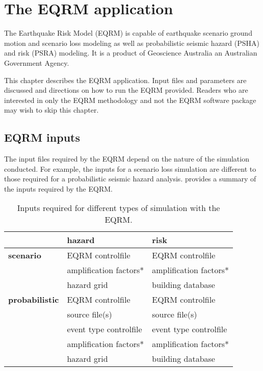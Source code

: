 \chapter{The EQRM application}
\label{ch:application}

The Earthquake Risk Model (EQRM) is capable of earthquake scenario
ground motion and scenario loss modeling as well as probabilistic
seismic hazard (PSHA) and risk (PSRA) modeling. It is a product of
Geoscience Australia an Australian Government Agency.

This chapter describes the EQRM application. Input files and
parameters are discussed and directions on how to run the EQRM
provided. Readers who are interested in only the EQRM methodology
and not the EQRM software package may wish to skip this chapter.

\section{EQRM inputs}

The input files required by the EQRM depend on the nature of the
simulation conducted. For example, the inputs for a scenario loss
simulation are different to those required for a probabilistic
seismic hazard analysis.  provides a
summary of the inputs required by the EQRM.


\begin{table}
\begin{centering}
\caption{Inputs required for different types of simulation with the
EQRM.} \label{tab:input-overview}
\begin{tabular}{|l|l|l|}
\hline
 & \textbf{hazard} & \textbf{risk} \\
\hline
\textbf{scenario} & EQRM controlfile & EQRM controlfile \\
  & amplification factors* & amplification factors* \\
  & hazard grid & building database \\
\hline
\textbf{probabilistic} & EQRM controlfile & EQRM controlfile\\
  & source file(s) & source file(s) \\
  & event type controlfile & event type controlfile \\
  & amplification factors* & amplification factors* \\
  & hazard grid & building database \\
\hline
\end{tabular}
\end{centering}
\end{table}








